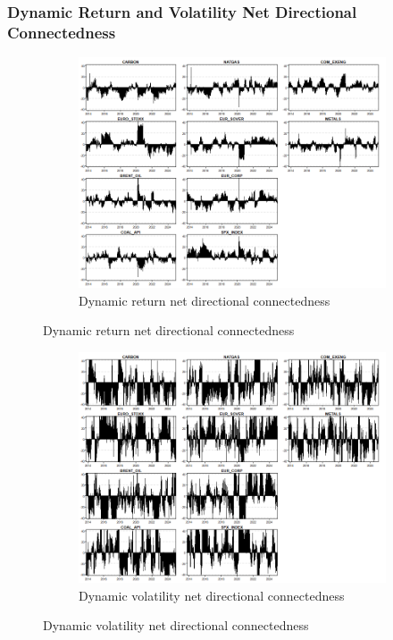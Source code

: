 \documentclass[preprint, 3p,
authoryear]{elsarticle} %
\begin{document}
\begin{landscape}
\subsubsection{Dynamic Return and Volatility Net Directional Connectedness}

\begin{figure}[H]
  \caption{Dynamic Net Directional Connectedness (Jan 2013 – Jan 2025)}
    \centering
      \begin{subfigure}[a]{\textwidth}
        \caption{Dynamic return net directional connectedness}
        \includegraphics[width = 1.25\linewidth]{23aApdxD-12-180-RetNDC}
      \end{subfigure}
\end{figure}
\begin{figure}[H]
  \ContinuedFloat
  \centering
      \begin{subfigure}[b]{\textwidth}
        \caption{Dynamic volatility net directional connectedness}
        \includegraphics[width = 1.25\linewidth]{23bApdxD-12-180-VolNDC}
      \end{subfigure}
\end{figure}




\end{landscape}
\end{document}
